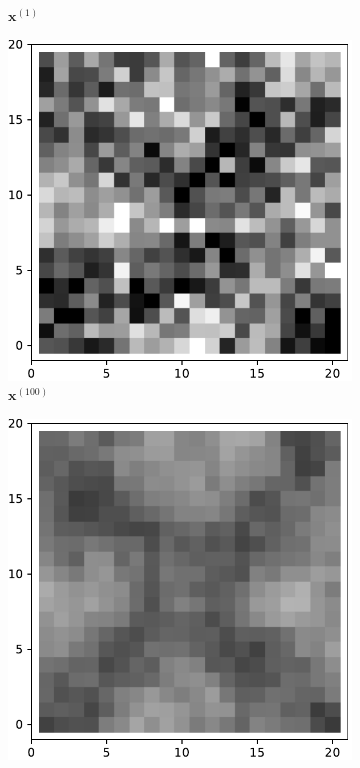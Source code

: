 \begin{figure}[!h]
\begin{subfigure}[b]{0.24\textwidth}
            \caption[]%
            {{\small $\mathbf{x}^{(1)}$}}    
            \label{fig:15d11}
        \end{subfigure}
        \begin{subfigure}[b]{0.24\textwidth}   
            \centering 
            \includegraphics[width=\textwidth]{./img/15d1-99.pdf}
            \caption[]%
            {{\small $\mathbf{x}^{(100)}$}}    
            \label{fig:15d1100}
        \end{subfigure}
        \begin{subfigure}[b]{0.24\textwidth}   
            \centering 
            \includegraphics[width=\textwidth]{./img/15d1mean.pdf}

\end{subfigure}
\end{figure}
